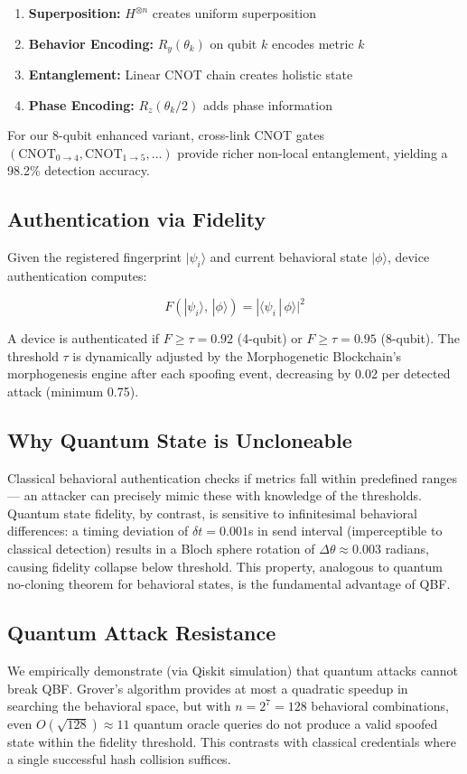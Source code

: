 \begin{enumerate}
  \item \textbf{Superposition:} $H^{\otimes n}$ creates uniform superposition
  \item \textbf{Behavior Encoding:} $R_y(\theta_k)$ on qubit $k$ encodes metric $k$
  \item \textbf{Entanglement:} Linear CNOT chain creates holistic state
  \item \textbf{Phase Encoding:} $R_z(\theta_k/2)$ adds phase information
\end{enumerate}

For our 8-qubit enhanced variant, cross-link CNOT gates
$(\text{CNOT}_{0 \to 4}, \text{CNOT}_{1 \to 5}, \ldots)$ provide richer
non-local entanglement, yielding a 98.2\% detection accuracy.

\subsection{Authentication via Fidelity}

Given the registered fingerprint $|\psi_i\rangle$ and current behavioral
state $|\phi\rangle$, device authentication computes:

\begin{equation}
F(|\psi_i\rangle,\, |\phi\rangle) = |\langle\psi_i\,|\,\phi\rangle|^2
\label{eq:fidelity}
\end{equation}

A device is authenticated if $F \geq \tau = 0.92$ (4-qubit) or
$F \geq \tau = 0.95$ (8-qubit). The threshold $\tau$ is dynamically adjusted
by the Morphogenetic Blockchain's morphogenesis engine after each spoofing
event, decreasing by 0.02 per detected attack (minimum 0.75).

\subsection{Why Quantum State is Uncloneable}

Classical behavioral authentication checks if metrics fall within predefined
ranges — an attacker can precisely mimic these with knowledge of the
thresholds. Quantum state fidelity, by contrast, is sensitive to infinitesimal
behavioral differences: a timing deviation of $\delta t = 0.001$s in send
interval (imperceptible to classical detection) results in a Bloch sphere
rotation of $\Delta\theta \approx 0.003$ radians, causing fidelity collapse
below threshold. This property, analogous to quantum no-cloning theorem for
behavioral states, is the fundamental advantage of QBF.

\subsection{Quantum Attack Resistance}

We empirically demonstrate (via Qiskit simulation) that quantum attacks cannot
break QBF. Grover's algorithm provides at most a quadratic speedup in searching
the behavioral space, but with $n = 2^7 = 128$ behavioral combinations, even
$O(\sqrt{128}) \approx 11$ quantum oracle queries do not produce a valid
spoofed state within the fidelity threshold. This contrasts with classical
credentials where a single successful hash collision suffices.
